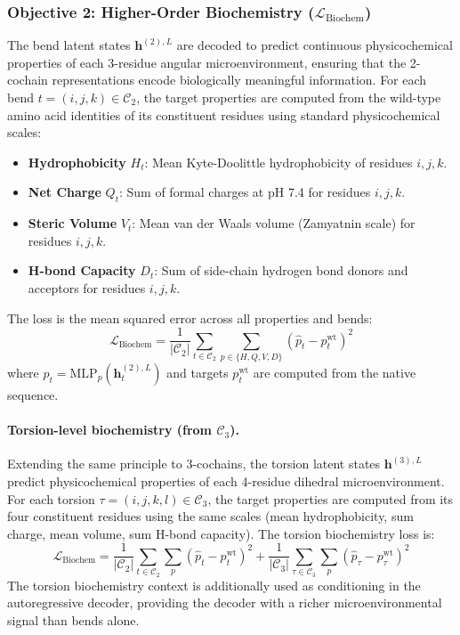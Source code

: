 \documentclass{article}
\begin{document}
\subsubsection{Objective 2: Higher-Order Biochemistry ($\mathcal{L}_{\text{Biochem}}$)}

The bend latent states $\mathbf{h}^{(2),L}$ are decoded to predict continuous physicochemical properties of each 3-residue angular microenvironment, ensuring that the 2-cochain representations encode biologically meaningful information. For each bend $t = (i,j,k) \in \mathcal{C}_2$, the target properties are computed from the wild-type amino acid identities of its constituent residues using standard physicochemical scales:

\begin{itemize}
    \item \textbf{Hydrophobicity} $H_t$: Mean Kyte-Doolittle hydrophobicity of residues $i, j, k$.
    \item \textbf{Net Charge} $Q_t$: Sum of formal charges at pH 7.4 for residues $i, j, k$.
    \item \textbf{Steric Volume} $V_t$: Mean van der Waals volume (Zamyatnin scale) for residues $i, j, k$.
    \item \textbf{H-bond Capacity} $D_t$: Sum of side-chain hydrogen bond donors and acceptors for residues $i, j, k$.
\end{itemize}

The loss is the mean squared error across all properties and bends:
\begin{equation}
    \mathcal{L}_{\text{Biochem}} = \frac{1}{|\mathcal{C}_2|} \sum_{t \in \mathcal{C}_2} \sum_{p \in \{H, Q, V, D\}} \left(\hat{p}_t - p_t^{\text{wt}}\right)^2
\end{equation}
where $\hat{p}_t = \text{MLP}_p(\mathbf{h}_t^{(2),L})$ and targets $p_t^{\text{wt}}$ are computed from the native sequence.

\paragraph{Torsion-level biochemistry (from $\mathcal{C}_3$).} Extending the same principle to 3-cochains, the torsion latent states $\mathbf{h}^{(3),L}$ predict physicochemical properties of each 4-residue dihedral microenvironment. For each torsion $\tau = (i,j,k,l) \in \mathcal{C}_3$, the target properties are computed from its four constituent residues using the same scales (mean hydrophobicity, sum charge, mean volume, sum H-bond capacity). The torsion biochemistry loss is:
\begin{equation}
    \mathcal{L}_{\text{Biochem}} = \frac{1}{|\mathcal{C}_2|} \sum_{t \in \mathcal{C}_2} \sum_{p} \left(\hat{p}_t - p_t^{\text{wt}}\right)^2 + \frac{1}{|\mathcal{C}_3|} \sum_{\tau \in \mathcal{C}_3} \sum_{p} \left(\hat{p}_\tau - p_\tau^{\text{wt}}\right)^2
\end{equation}
The torsion biochemistry context is additionally used as conditioning in the autoregressive decoder, providing the decoder with a richer microenvironmental signal than bends alone.
\end{document}
